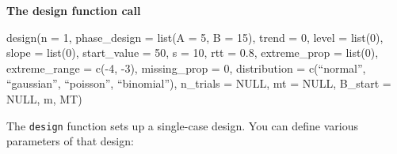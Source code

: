 \documentclass[
  letterpaper,
  DIV=11,
  numbers=noendperiod]{scrreprt}
\begin{document}
\begin{tcolorbox}[enhanced jigsaw, breakable, rightrule=.15mm, bottomrule=.15mm, arc=.35mm, colback=white, colframe=quarto-callout-tip-color-frame, opacityback=0, leftrule=.75mm, toprule=.15mm, left=2mm]
\begin{minipage}[t]{5.5mm}
\textcolor{quarto-callout-tip-color}{\faLightbulb}
\end{minipage}%
\begin{minipage}[t]{\textwidth - 5.5mm}

\textbf{The design function call}\vspace{2mm}

design(n = 1, phase\_design = list(A = 5, B = 15), trend = 0, level =
list(0), slope = list(0), start\_value = 50, s = 10, rtt = 0.8,
extreme\_prop = list(0), extreme\_range = c(-4, -3), missing\_prop = 0,
distribution = c(``normal'', ``gaussian'', ``poisson'', ``binomial''),
n\_trials = NULL, mt = NULL, B\_start = NULL, m, MT)

\end{minipage}%
\end{tcolorbox}

The \texttt{design} function sets up a single-case design. You can
define various parameters of that design:
\end{document}

